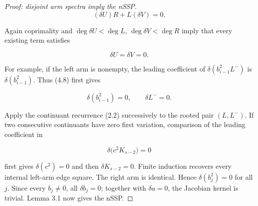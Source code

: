 \documentclass[11pt]{article}
\theoremstyle{remark}
\begin{document}
\begin{proof}[Proof: disjoint arm spectra imply the nSSP]
\[
  (\delta U)R+L(\delta V)=0.                              \tag{4.7}
\]

Again coprimality and
$\deg\delta U<\deg L$, $\deg\delta V<\deg R$ imply that every existing term satisfies

\[
  \delta U=\delta V=0.                                   \tag{4.8}
\]

For example, if the left arm is nonempty, the leading coefficient of
$\delta(b_{i-1}^2L^-)$ is $\delta(b_{i-1}^2)$. Thus (4.8) first gives

\[
  \delta(b_{i-1}^2)=0,\qquad \delta L^-=0.
\]

Apply the continuant recurrence (2.2) successively to the rooted pair $(L,L^-)$. If two consecutive
continuants have zero first variation, comparison of the leading coefficient in

\[
  \delta\bigl(c^2K_{s-2}\bigr)=0
\]

first gives $\delta(c^2)=0$ and then $\delta K_{s-2}=0$. Finite induction recovers every internal
left-arm edge square. The right arm is identical. Hence $\delta(b_j^2)=0$ for all $j$. Since every
$b_j\neq0$, all $\delta b_j=0$; together with $\delta a=0$, the Jacobian kernel is trivial.
Lemma 3.1 now gives the nSSP.

\end{proof}
\end{document}
